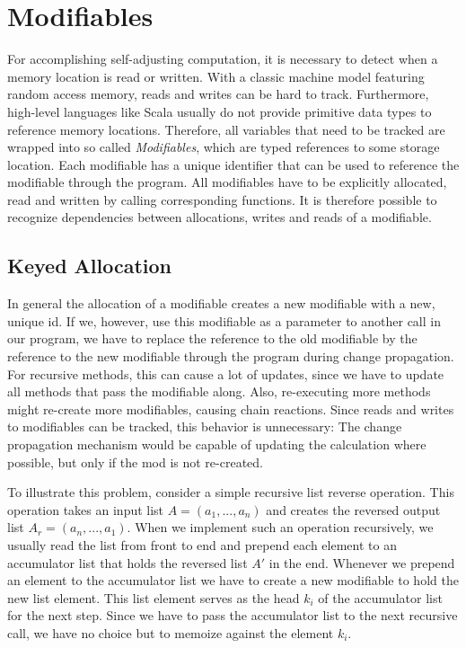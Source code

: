 \section{Modifiables}


For accomplishing self-adjusting computation, it is necessary to detect when a memory location is read or written. With a classic machine model featuring random access memory, reads and writes can be hard to track. Furthermore, high-level languages like Scala usually do not provide primitive data types to reference memory locations. Therefore, all variables that need to be tracked are wrapped into so called \textit{Modifiables}, which are typed references to some storage location. Each modifiable has a unique identifier that can be used to reference the modifiable through the program. All modifiables have to be explicitly allocated, read and written by calling corresponding functions. It is therefore possible to recognize dependencies between allocations, writes and reads of a modifiable. 

\subsection{Keyed Allocation}
\label{sec:keyed_alloc}

In general the allocation of a modifiable creates a new modifiable with a new, unique id. If we, however, use this modifiable as a parameter to another call in our program, we have to replace the reference to the old modifiable by the reference to the new modifiable through the program during change propagation. For recursive methods, this can cause a lot of updates, since we have to update all methods that pass the modifiable along. Also, re-executing more methods might re-create more modifiables, causing chain reactions. 
Since reads and writes to modifiables can be tracked, this behavior is unnecessary: The change propagation mechanism would be capable of updating the calculation where possible, but only if the mod is not re-created. 

To illustrate this problem, consider a simple recursive list reverse operation. This operation takes an input list $A = (a_1, ..., a_n)$ and creates the reversed output list $A_r = (a_n, ..., a_1)$. When we implement such an operation recursively, we usually read the list from front to end and prepend each element to an accumulator list that holds the reversed list $A'$ in the end. Whenever we prepend an element to the accumulator list we have to create a new modifiable to hold the new list element. This list element serves as the head $k_i$ of the accumulator list for the next step. Since we have to pass the accumulator list to the next recursive call, we have no choice but to memoize against the element $k_i$.

